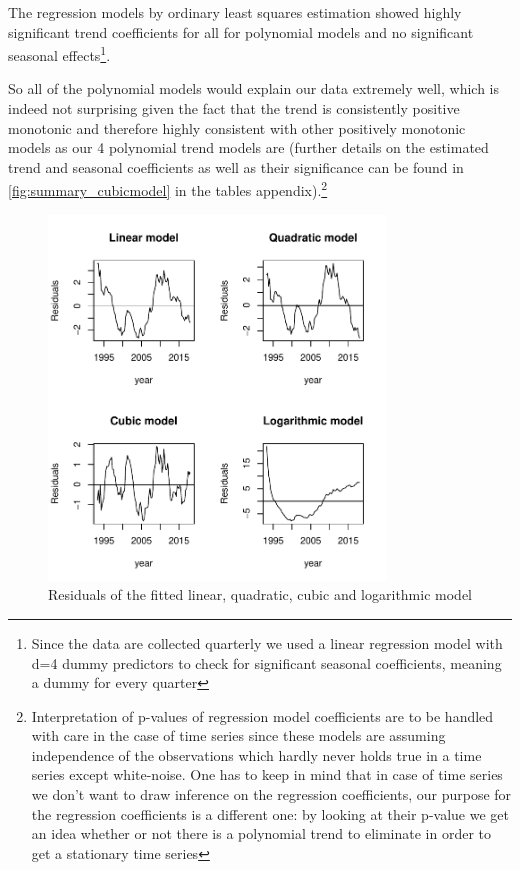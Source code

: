 \documentclass[11pt,a4paper]{article}
\begin{document}
The regression models by ordinary least squares estimation \cite[p.~11]{htf09} showed highly significant trend coefficients for all for polynomial models and no significant seasonal effects\footnote{Since the data are collected quarterly we used a linear regression model with d=4 dummy predictors to check for significant seasonal coefficients, meaning a dummy for every quarter}.

So all of the polynomial models would explain our data extremely well, which is indeed not surprising given the fact that the trend is consistently positive monotonic and therefore highly consistent with other positively monotonic models as our 4 polynomial trend models are (further details on the estimated trend and seasonal coefficients as well as their significance can be found in \cref{fig:summary_cubicmodel} in the tables appendix).\footnote{
    Interpretation of p-values of regression model coefficients are to be handled with care in the case of time series since these models are assuming independence of the observations which hardly never holds true in a time series except white-noise.
    One has to keep in mind that in case of time series we don't want to draw inference on the regression coefficients, our purpose for the regression coefficients is a different one: by looking at their p-value we get an idea whether or not there is a polynomial trend to eliminate in order to get a stationary time series
}

\begin{figure}
    \centering
    \includegraphics[angle=0,width=0.8\textwidth]{resid_polynomials}
    \caption{Residuals of the fitted linear, quadratic, cubic and logarithmic model}
    \label{fig:resid_polynomials}
\end{figure}
\end{document}

